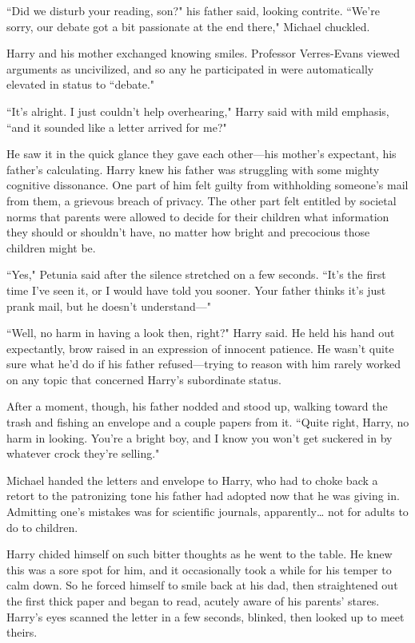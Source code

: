 ``Did we disturb your reading, son?" his father said, looking contrite. ``We're sorry, our debate got a bit passionate at the end there," Michael chuckled.

Harry and his mother exchanged knowing smiles. Professor Verres-Evans viewed arguments as uncivilized, and so any he participated in were automatically elevated in status to ``debate."

``It's alright. I just couldn't help overhearing," Harry said with mild emphasis, ``and it sounded like a letter arrived for me?"

He saw it in the quick glance they gave each other---his mother's expectant, his father's calculating. Harry knew his father was struggling with some mighty cognitive dissonance. One part of him felt guilty from withholding someone's mail from them, a grievous breach of privacy. The other part felt entitled by societal norms that parents were allowed to decide for their children what information they should or shouldn't have, no matter how bright and precocious those children might be.

``Yes," Petunia said after the silence stretched on a few seconds. ``It's the first time I've seen it, or I would have told you sooner. Your father thinks it's just prank mail, but he doesn't understand---"

``Well, no harm in having a look then, right?" Harry said. He held his hand out expectantly, brow raised in an expression of innocent patience. He wasn't quite sure what he'd do if his father refused---trying to reason with him rarely worked on any topic that concerned Harry's subordinate status.

After a moment, though, his father nodded and stood up, walking toward the trash and fishing an envelope and a couple papers from it. ``Quite right, Harry, no harm in looking. You're a bright boy, and I know you won't get suckered in by whatever crock they're selling."

Michael handed the letters and envelope to Harry, who had to choke back a retort to the patronizing tone his father had adopted now that he was giving in. Admitting one's mistakes was for scientific journals, apparently{\ldots} not for adults to do to children.

Harry chided himself on such bitter thoughts as he went to the table. He knew this was a sore spot for him, and it occasionally took a while for his temper to calm down. So he forced himself to smile back at his dad, then straightened out the first thick paper and began to read, acutely aware of his parents' stares. Harry's eyes scanned the letter in a few seconds, blinked, then looked up to meet theirs.

